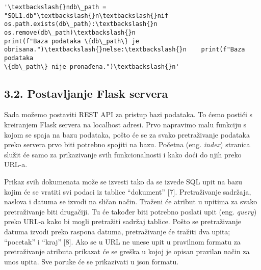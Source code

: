 \documentclass[11pt]{article}
\makeatletter
\newcommand{\boxspacing}{\kern\kvtcb@left@rule\kern\kvtcb@boxsep}
\newcommand{\prompt}[4]{
        {\ttfamily\llap{{\color{#2}[#3]:\hspace{3pt}#4}}\vspace{-\baselineskip}}
    }
\makeatother
\begin{document}
            \begin{tcolorbox}[breakable, size=fbox, boxrule=.5pt, pad at break*=1mm, opacityfill=0]
\prompt{Out}{outcolor}{129}{\boxspacing}
\begin{Verbatim}[commandchars=\\\{\}]
'\textbackslash{}ndb\_path = "SQL1.db"\textbackslash{}n\textbackslash{}nif os.path.exists(db\_path):\textbackslash{}n    os.remove(db\_path)\textbackslash{}n
print(f"Baza podataka \{db\_path\} je obrisana.")\textbackslash{}nelse:\textbackslash{}n    print(f"Baza podataka
\{db\_path\} nije pronađena.")\textbackslash{}n'
\end{Verbatim}
\end{tcolorbox}
        
    \hypertarget{postavljanje-flask-servera}{%
\subsection{3.2. Postavljanje Flask
servera}\label{postavljanje-flask-servera}}

Sada možemo postaviti REST API za pristup bazi podataka. To ćemo postići
s kreiranjem Flask servera na localhost adresi. Prvo napravimo malu
funkciju s kojom se spaja na bazu podataka, pošto će se za svako
pretraživanje podataka preko servera prvo biti potrebno spojiti na bazu.
Početna (eng. \emph{index}) stranica služit će samo za prikazivanje svih
funkcionalnosti i kako doći do njih preko URL-a.

Prikaz svih dokumenata može se izvesti tako da se izvede SQL upit na
bazu kojim će se vratiti svi podaci iz tablice ``dokument'' {[}7{]}.
Pretraživanje sadržaja, naslova i datuma se izvodi na sličan način.
Traženi će atribut u upitima za svako pretraživanje biti drugačiji. Tu
će također biti potrebno poslati upit (eng. \emph{query}) preko URL-a
kako bi mogli pretražiti sadržaj tablice. Pošto se pretraživanje datuma
izvodi preko raspona datuma, pretraživanje će tražiti dva upita;
``pocetak'' i ``kraj'' {[}8{]}. Ako se u URL ne unese upit u pravilnom
formatu za pretraživanje atributa prikazat će se greška u kojoj je
opisan pravilan način za unos upita. Sve poruke će se prikazivati u json
formatu.
\end{document}
